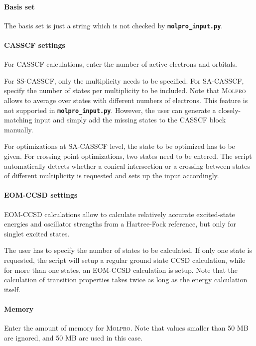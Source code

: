 \documentclass[a4paper,10pt,DIV=15,openany,twoside=false]{scrbook}
\newcommand{\ttt}[1]{\textbf{\texttt{#1}}}
\begin{document}
\paragraph{Basis set}

The basis set is just a string which is not checked by \ttt{molpro\_input.py}. 

\paragraph{CASSCF settings}

For CASSCF calculations, enter the number of active electrons and orbitals. 

For SS-CASSCF, only the multiplicity needs to be specified. For SA-CASSCF, specify the number of states per multiplicity to be included. Note that \textsc{Molpro} allows to average over states with different numbers of electrons. This feature is not supported in \ttt{molpro\_input.py}. However, the user can generate a closely-matching input and simply add the missing states to the CASSCF block manually. 

For optimizations at SA-CASSCF level, the state to be optimized has to be given. For crossing point optimizations, two states need to be entered. The script automatically detects whether a conical intersection or a crossing between states of different multiplicity is requested and sets up the input accordingly.

\paragraph{EOM-CCSD settings}

EOM-CCSD calculations allow to calculate relatively accurate excited-state energies and oscillator strengths from a Hartree-Fock reference, but only for singlet excited states.

The user has to specify the number of states to be calculated. If only one state is requested, the script will setup a regular ground state CCSD calculation, while for more than one states, an EOM-CCSD calculation is setup.
Note that the calculation of transition properties takes twice as long as the energy calculation itself.

\paragraph{Memory}

Enter the amount of memory for \textsc{Molpro}. Note that values smaller than 50 MB are ignored, and 50 MB are used in this case.
\end{document}
